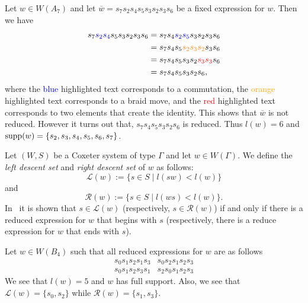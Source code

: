 \begin{example}
Let $w \in W(A_7)$ and let $\overline{w}=s_7s_2s_4s_5s_3s_2s_3s_6$ be a fixed expression for $w$. Then we have
\begin{align*}
s_7\textcolor{blue}{s_2s_4}s_5s_3s_2s_3s_6&=s_7s_4\textcolor{blue}{s_2s_5}s_3s_2s_3s_6\\
&=s_7s_4s_5\textcolor{orange}{s_2s_3s_2} s_3s_6\\
&=s_7s_4s_5s_3s_2\textcolor{red}{s_3s_3}s_6\\
&=s_7s_4s_5s_3s_2s_6,
\end{align*}
where the \textcolor{blue}{blue} highlighted text corresponds to a commutation, the \textcolor{orange}{orange} highlighted text corresponds to a braid move, and the \textcolor{red}{red} highlighted text corresponds to two elements that create the identity. This shows that $\overline{w}$ is not reduced. However it turns out that, $s_7s_4s_5s_3s_2s_6$ is reduced. Thus $l(w)=6$ and $\mathrm{supp}(w)=\{s_2, s_3, s_4, s_5, s_6, s_7\}$.
\end{example}

Let $(W,S)$ be a Coxeter system of type $\Gamma$ and let $w \in W(\Gamma)$. We define the \emph{left descent set} and \emph{right descent set} of $w$ as follows:
\[\mathcal{L}(w):=\{s \in S \mid l(sw) < l(w)\}\]
and
\[\mathcal{R}(w):=\{s \in S \mid l(ws) < l(w)\}.\]
In~\cite{Bjorner2005} it is shown that $s \in \mathcal{L}(w)$ (respectively, $s \in \mathcal{R}(w)$) if and only if there is a reduced expression for $w$ that begins with $s$ (respectively, there is a reduce expression for $w$ that ends with $s$).

\begin{example}
Let $w \in W(B_4)$ such that all reduced expressions for $w$ are as follows 
$$\begin{array}{ll}
s_0s_1s_2s_1s_3 & s_0s_2s_1s_2s_3\\
s_0s_1s_2s_3s_1 & s_2s_0s_1s_2s_3	
\end{array}$$
We see that $l(w)=5$ and $w$ has full support. Also, we see that $\mathcal{L}(w)=\{s_0, s_2\}$ while $\mathcal{R}(w)=\{s_1, s_3\}$.	
\end{example}

